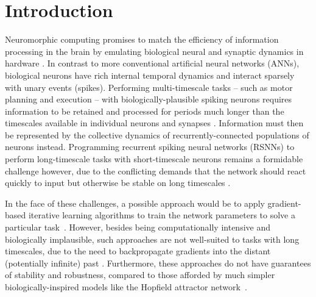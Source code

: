 \section{Introduction}
\label{sec:introduction}
Neuromorphic computing promises to match the efficiency of information processing in the brain by emulating biological neural and synaptic dynamics in hardware \cite{mead_neuromorphic_1990}. In contrast to more conventional artificial neural networks (ANNs), biological neurons have rich internal temporal dynamics and interact sparsely with unary events (spikes). Performing multi-timescale tasks -- such as motor planning and execution -- with biologically-plausible spiking neurons requires information to be retained and processed for periods much longer than the timescales available in individual neurons and synapses \cite{Ganguli_etal08,khona_attractor_2022}. Information must then be represented by the collective dynamics of recurrently-connected populations of neurons instead. Programming recurrent spiking neural networks (RSNNs) to perform long-timescale tasks with short-timescale neurons remains a formidable challenge however, due to the conflicting demands that the network should react quickly to input but otherwise be stable on long timescales \cite{hochreiter_long_1997}. 


In the face of these challenges, a possible approach would be to apply gradient-based iterative learning algorithms to train the network parameters to solve a particular task~\cite{bellec_solution_2020, cramer_surrogate_2022, neftci_surrogate_2019}.
However, besides being computationally intensive and biologically implausible, such approaches are not well-suited to tasks with long timescales, due to the need to backpropagate gradients into the distant (potentially infinite) past \cite{miller_stable_2019}.
Furthermore, these approaches do not have guarantees of stability and robustness, compared to those afforded by much simpler biologically-inspired models like the Hopfield attractor network~\cite{hopfield_neural_1982, amit_modeling_1989}.

